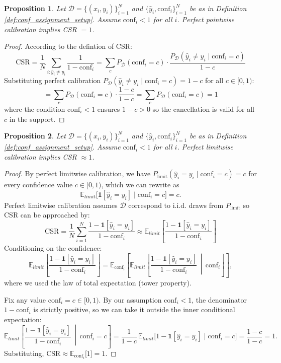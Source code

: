 \documentclass{article}
\theoremstyle{plain}
\newtheorem{theorem}{Proposition}
\theoremstyle{definition}
\theoremstyle{remark}
\begin{document}
\begin{theorem} \label{theorem:PerfectCal_is_CSR_one}
Let $\mathcal{D} = \{(x_i, y_i)\}_{i=1}^N$ and $\{\hat{y}_i, \text{conf}_i\}_{i=1}^N$ be as in Definition \ref{def:conf_assignment_setup}.  Assume $\text{conf}_i < 1$ for all $i$. Perfect pointwise calibration implies CSR $ = 1$.
\end{theorem}
\begin{proof}
According to the defintion of CSR: \[
\text{CSR} = \frac{1}{N}\sum_{i:\hat{y}_i \neq y_i} \frac{1}{1-\text{conf}_i} = \sum_c P_{\mathcal{D}}(\text{conf}_i = c) \cdot \frac{P_{\mathcal{D}}(\hat{y}_i \neq y_i \mid \text{conf}_i = c)}{1-c} \]
Substituting perfect calibration $P_{\mathcal{D}}(\hat{y}_i \neq y_i \mid \text{conf}_i = c) = 1 - c$  for all $c \in [0,1)$:\[
= \sum_c P_{\mathcal{D}}(\text{conf}_i = c) \cdot \frac{1-c}{1-c} = \sum_c P_{\mathcal{D}}(\text{conf}_i = c) = 1
\]
where the condition $\text{conf}_i < 1$ ensures $1-c > 0$ so the cancellation is valid for all $c$ in the support.
\end{proof}
\bigskip


\begin{theorem} \label{theorem:PerfectCal_is_CSR_one_limitwise}
Let $\mathcal{D} = \{(x_i, y_i)\}_{i=1}^N$ and $\{\hat{y}_i, \text{conf}_i\}_{i=1}^N$ be as in Definition \ref{def:conf_assignment_setup}. Assume $\text{conf}_i < 1$ for all $i$. Perfect limitwise calibration implies CSR $ \approx 1$.
\end{theorem}
\begin{proof}
By perfect limitwise calibration, we have $P_{\text{limit}}(\hat{y}_i = y_i \mid \text{conf}_i = c) = c$  for every confidence value $c \in [0,1)$, which we can rewrite as
\[
\mathbb{E}_{limit}\big[\mathbf{1}[\hat{y}_i = y_i] \mid \text{conf}_i = c\big] = c.
\]
Perfect limitwise calibration assumes $\mathcal{D}$ correspond to i.i.d. draws from $P_{\text{limit}}$ so CSR can be approached by:
\[
\text{CSR} = \frac{1}{N}\sum_{i=1}^N \frac{1 - \mathbf{1}[\hat{y}_i = y_i]}{1 - \text{conf}_i} \approx \mathbb{E}_{limit}\left[\frac{1 - \mathbf{1}[\hat{y}_i = y_i]}{1 - \text{conf}_i}\right] 
\]
Conditioning on the confidence:
\[
\mathbb{E}_{limit}\left[\frac{1 - \mathbf{1}[\hat{y}_i = y_i]}{1 - \text{conf}_i}\right] = \mathbb{E}_{\text{conf}_i}\left[   \mathbb{E}_{limit}\left[\frac{1 - \mathbf{1}[\hat{y}_i = y_i]}{1 - \text{conf}_i}  \,\middle|\, \text{conf}_i\right] \right],
\]
where we used the law of total expectation (tower property).

Fix any value $\text{conf}_i = c \in [0,1)$.
By our assumption $\text{conf}_i < 1$, the denominator $1 - \text{conf}_i$ is strictly positive, so we can take it outside the inner conditional expectation:
\[
\mathbb{E}_{limit}\left[\frac{1 - \mathbf{1}[\hat{y}_i = y_i]}{1 - \text{conf}_i}
\,\middle|\, \text{conf}_i = c\right]
= 
\frac{1}{1 - c}\,
\mathbb{E}_{limit}\big[1 - \mathbf{1}[\hat{y}_i = y_i] \mid \text{conf}_i = c\big]
= \frac{1 - c}{1 - c} = 1.
\]
Substituting, $\text{CSR} \approx \mathbb{E}_{\text{conf}_i}\big[1\big]= 1$.
\end{proof}
\bigskip
\end{document}
